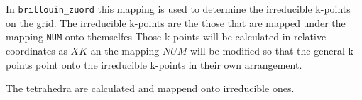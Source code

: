 \documentclass[11pt,a4paper]{report}
\begin{document}
In \verb|brillouin_zuord| this mapping is used to determine the
irreducible k-points on the grid. The irreducible k-points are the
those that are mapped under the mapping \verb|NUM| onto themselfes
Those k-points will be calculated in relative coordinates as $XK$ an
the mapping $NUM$ will be modified so that the general k-points point
onto the irreducible k-points in their own arrangement.

The tetrahedra are calculated and mappend onto irreducible ones.


\appendix
\section{}



\end{document}
